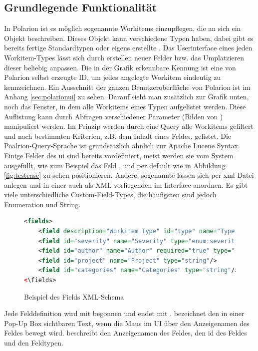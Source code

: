 \subsection{Grundlegende Funktionalität}
\label{sub:funkti}
In Polarion ist es möglich sogenannte Workitems einzupflegen, die an sich ein Objekt beschreiben. Dieses Objekt kann verschiedene Typen haben, dabei gibt es bereits fertige Standardtypen oder eigens erstellte . Das Userinterface eines jeden Workitem-Types lässt sich durch erstellen neuer Felder bzw. das Umplatzieren dieser beliebig anpassen. 
Die in der Grafik erkennbare Kennung  ist eine von Polarion selbst erzeugte ID, um jedes angelegte Workitem eindeutig zu kennzeichnen. Ein Ausschnitt der ganzen Benutzeroberfläche von Polarion ist im Anhang \ref{sec:polarionui} zu sehen. Darauf sieht man zusätzlich zur Grafik unten, noch das Fenster, in dem alle Workitems eines Typen aufgelistet werden. Diese Auflistung kann durch Abfragen verschiedener Parameter (Bilden von ) manipuliert werden. Im Prinzip werden durch eine Query alle Workitems gefiltert und nach bestimmten Kriterien, z.B. dem Inhalt eines Feldes, gelistet. Die Poalrion-Query-Sprache ist grundsätzlich ähnlich zur Apache Lucene Syntax. \cite{13}
Einige Felder des \ac{ui} sind bereits vordefiniert, meist werden sie vom System ausgefüllt, wie zum Beispiel das Feld , und per default wie in Abbildung \ref{fig:testcase} zu sehen positionieren. Andere, sogenannte  lassen sich per \ac{xml}-Datei anlegen und in einer auch als XML vorliegenden  im Interface anordnen. Es gibt viele unterschiedliche Custom-Field-Types, die häufigsten sind jedoch Enumeration und String.
\\
\begin{figure}[H]
\begin{lstlisting}[language=XML]
<fields>
	<field description="Workitem Type" id="type" name="Type" type="enum:type"/>
	<field id="severity" name="Severity" type="enum:severity"/>
	<field id="author" name="Author" required="true" type="string"/>
	<field id="project" name="Project" type="string"/>
	<field id="categories" name="Categories" type="string"/>
<\fields>
\end{lstlisting}
\caption{Beispiel des Fields XML-Schema}
\label{fig:schema}
\end{figure} 
Jede Felddefinition wird mit  begonnen und endet mit \inline{/>}.  bezeichnet den in einer Pop-Up Box sichtbaren Text, wenn die Maus im UI über den Anzeigenamen des Feldes bewegt wird.  beschreibt den Anzeigenamen des Feldes,  den \ac{id} des Feldes und  den Feldtypen.

